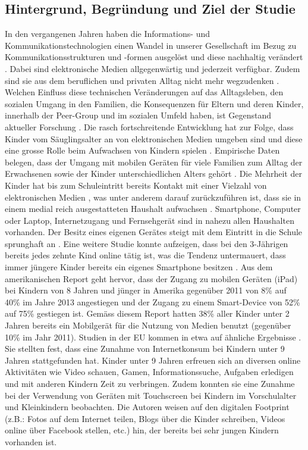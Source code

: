 \subsection{Hintergrund, Begründung und Ziel der Studie}\label{sec:Hintergrund}
In den vergangenen Jahren haben die Informations- und Kommunikationstechnologien einen Wandel in unserer Gesellschaft im Bezug zu Kommunikationsstrukturen und -formen ausgelöst und diese nachhaltig verändert \cite{Hasebrink2009, Bms2013}. Dabei sind elektronische Medien allgegenwärtig und jederzeit verfügbar. Zudem sind sie aus dem beruflichen und privaten Alltag nicht mehr wegzudenken \cite{Bmfsfj2013}. Welchen Einfluss diese technischen Veränderungen auf das Alltagsleben, den sozialen Umgang in den Familien, die Konsequenzen für Eltern und deren Kinder, innerhalb der Peer-Group und im sozialen Umfeld haben, ist Gegenstand aktueller Forschung \cite{Olafsson2014}. Die rasch fortschreitende Entwicklung hat zur Folge, dass Kinder vom Säuglingsalter an von elektronischen Medien umgeben sind und diese eine grosse Rolle beim Aufwachsen von Kindern spielen \cite{Feierabend2015, Divsi2015}. Empirische Daten belegen, dass der Umgang mit mobilen Geräten für viele Familien zum Alltag der Erwachsenen sowie der Kinder unterschiedlichen Alters gehört \cite{Wagner2016}. Die Mehrheit der Kinder hat bis zum Schuleintritt bereits Kontakt mit einer Vielzahl von elektronischen Medien \cite{Feierabend2015}, was unter anderem darauf zurückzuführen ist, dass sie in einem medial reich ausgestatteten Haushalt aufwachsen \cite{Suter2015}. Smartphone, Computer oder Laptop, Internetzugang und Fernsehgerät sind in nahezu allen Haushalten vorhanden. Der Besitz eines eigenen Gerätes steigt mit dem Eintritt in die Schule sprunghaft an \cite{Feierabend2015a}. Eine weitere Studie konnte aufzeigen, dass bei den 3-Jährigen bereits jedes zehnte Kind online tätig ist, was die Tendenz untermauert, dass immer jüngere Kinder bereits ein eigenes Smartphone besitzen \cite{Divsi2015}. Aus dem amerikanischen Report  geht hervor, dass der Zugang zu mobilen Geräten (iPad) bei Kindern von 8 Jahren und jünger in Amerika gegenüber 2011 von 8\% auf 40\% im Jahre 2013 angestiegen und der Zugang zu einem Smart-Device von 52\% auf 75\% gestiegen ist. Gemäss diesem Report hatten 38\% aller Kinder unter 2 Jahren bereits ein Mobilgerät für die Nutzung von Medien benutzt (gegenüber 10\% im Jahr 2011). Studien in der EU kommen in etwa auf ähnliche Ergebnisse \cite{Holloway2013}. Sie stellten fest, dass eine Zunahme von Internetkonsum bei Kindern unter 9 Jahren stattgefunden hat. Kinder unter 9 Jahren erfreuen sich an diversen online Aktivitäten wie Video schauen, Gamen, Informationssuche, Aufgaben erledigen 
und mit anderen Kindern Zeit zu verbringen. Zudem konnten sie eine Zunahme bei der Verwendung von Geräten mit Touchscreen bei Kindern im Vorschulalter und Kleinkindern beobachten. Die Autoren weisen auf den digitalen Footprint (z.B.: Fotos auf dem Internet teilen, Blogs über die Kinder schreiben, Videos online über Facebook stellen, etc.) hin, der bereits bei sehr jungen Kindern vorhanden ist.

